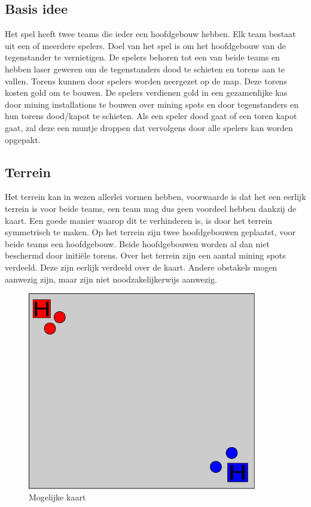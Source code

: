 \subsection{Basis idee}
Het spel heeft twee teams die ieder een hoofdgebouw hebben. Elk team bestaat uit een of meerdere spelers. Doel van het spel is om het hoofdgebouw van de tegenstander te vernietigen. De spelers behoren tot een van beide teams en hebben laser geweren om de tegenstanders dood te schieten en torens aan te vallen. Torens kunnen door spelers worden neergezet op de map. Deze torens kosten gold om te bouwen. De spelers verdienen gold in een gezamenlijke kas door mining installations te bouwen over mining spots en door tegenstanders en hun torens dood/kapot te schieten. Als een speler dood gaat of een toren kapot gaat, zal deze een muntje droppen dat vervolgens door alle spelers kan worden opgepakt.

\subsection{Terrein}
Het terrein kan in wezen allerlei vormen hebben, voorwaarde is dat het een eerlijk terrein is voor beide teams, een team mag dus geen voordeel hebben dankzij de kaart. Een goede manier waarop dit te verhinderen is, is door het terrein symmetrisch te maken. Op het terrein zijn twee hoofdgebouwen geplaatst, voor beide teams een hoofdgebouw. Beide hoofdgebouwen worden al dan niet beschermd door initi\"ele torens. Over het terrein zijn een aantal mining spots verdeeld. Deze zijn eerlijk verdeeld over de kaart. Andere obstakels mogen aanwezig zijn, maar zijn niet noodzakelijkerwijs aanwezig.

\begin{figure}
\center
\includegraphics[width = 10cm]{Map1.eps}
\caption{Mogelijke kaart}
\label{fig:hist}
\end{figure}

